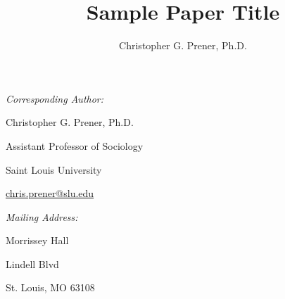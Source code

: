 \documentclass[12pt]{article}
\title{Sample Paper Title}
\author{Christopher G. Prener, Ph.D.}
\date{}
\begin{document}

\maketitle

\vspace{10mm}
\par \noindent \textit{Corresponding Author:}
\par \noindent Christopher G. Prener, Ph.D.
\par \noindent Assistant Professor of Sociology
\par \noindent Saint Louis University
\par \noindent \href{chris.prener@slu.edu}{chris.prener@slu.edu}

\vspace{5mm}
\par \noindent \textit{Mailing Address:}
\par {} Morrissey Hall
\par {} Lindell Blvd
\par \noindent St. Louis, MO 63108

\end{document}
